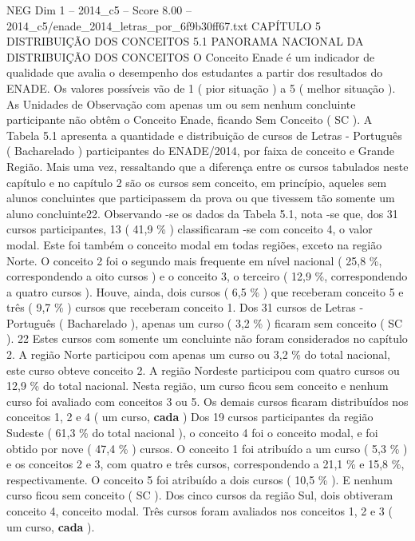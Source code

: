 \begin{textsample}{NEG Dim 1 – 2014\_c5 – Score 8.00 – 2014\_c5/enade\_2014\_letras\_por\_6f9b30ff67.txt}  \label{ex:f1_neg_338}
CAPÍTULO 5 DISTRIBUIÇÃO DOS CONCEITOS 5.1 PANORAMA NACIONAL DA DISTRIBUIÇÃO DOS CONCEITOS O Conceito Enade é um indicador de qualidade que avalia o desempenho dos estudantes a partir dos resultados do ENADE.
Os valores possíveis vão de 1 ( pior situação ) a 5 ( melhor situação ).
As Unidades de Observação com apenas um ou sem nenhum concluinte participante não obtêm o Conceito Enade, ficando Sem Conceito ( SC ).
A Tabela 5.1 apresenta a quantidade e distribuição de cursos de Letras - Português ( Bacharelado ) participantes do ENADE/2014, por faixa de conceito e Grande Região.
Mais uma vez, ressaltando que a diferença entre os cursos tabulados neste capítulo e no capítulo 2 são os cursos sem conceito, em princípio, aqueles sem alunos concluintes que participassem da prova ou que tivessem tão somente um aluno concluinte22.
Observando -se os dados da Tabela 5.1, nota -se que, dos 31 cursos participantes, 13 ( 41,9 \% ) classificaram -se com conceito 4, o valor modal.
Este foi também o conceito modal em todas regiões, exceto na região Norte.
O conceito 2 foi o segundo mais frequente em nível nacional ( 25,8 \%, correspondendo a oito cursos ) e o conceito 3, o terceiro ( 12,9 \%, correspondendo a quatro cursos ).
Houve, ainda, dois cursos ( 6,5 \% ) que receberam conceito 5 e três ( 9,7 \% ) cursos que receberam conceito 1.
Dos 31 cursos de Letras - Português ( Bacharelado ), apenas um curso ( 3,2 \% ) ficaram sem conceito ( SC ). 22 Estes cursos com somente um concluinte não foram considerados no capítulo 2.
A região Norte participou com apenas um curso ou 3,2 \% do total nacional, este curso obteve conceito 2.
A região Nordeste participou com quatro cursos ou 12,9 \% do total nacional.
Nesta região, um curso ficou sem conceito e nenhum curso foi avaliado com conceitos 3 ou 5.
Os demais cursos ficaram distribuídos nos conceitos 1, 2 e 4 ( um curso, \textbf{cada} ) Dos 19 cursos participantes da região Sudeste ( 61,3 \% do total nacional ), o conceito 4 foi o conceito modal, e foi obtido por nove ( 47,4 \% ) cursos.
O conceito 1 foi atribuído a um curso ( 5,3 \% ) e os conceitos 2 e 3, com quatro e três cursos, correspondendo a 21,1 \% e 15,8 \%, respectivamente.
O conceito 5 foi atribuído a dois cursos ( 10,5 \% ).
E nenhum curso ficou sem conceito ( SC ).
Dos cinco cursos da região Sul, dois obtiveram conceito 4, conceito modal.
Três cursos foram avaliados nos conceitos 1, 2 e 3 ( um curso, \textbf{cada} ).

\end{textsample}
